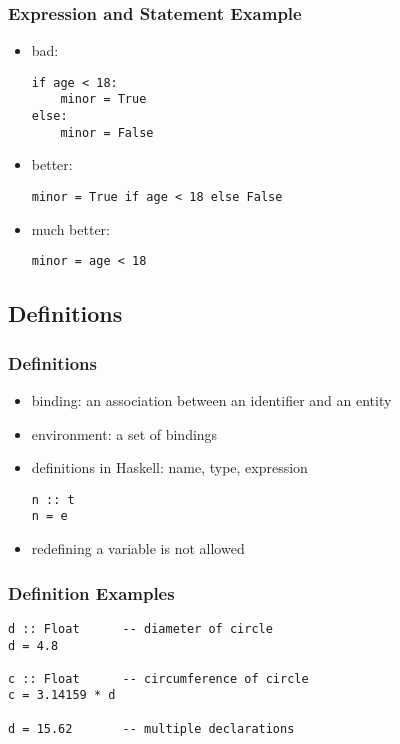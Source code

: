 \documentclass[dvipsnames]{beamer}
\theoremstyle{plain}
\begin{document}
\begin{frame}[fragile]
  \frametitle{Expression and Statement Example}

  \begin{itemize}
    \item bad:
    \smallskip
    \begin{lstlisting}
if age < 18:
    minor = True
else:
    minor = False
    \end{lstlisting}

    \pause
    \medskip
    \item better:
    \smallskip
    \begin{lstlisting}
minor = True if age < 18 else False
    \end{lstlisting}

    \pause
    \medskip
    \item much better:
    \smallskip
    \begin{lstlisting}
minor = age < 18
    \end{lstlisting}
  \end{itemize}
\end{frame}

\subsection{Definitions}


\begin{frame}[fragile]
  \frametitle{Definitions}

  \begin{itemize}
    \item \alert{binding}: an association between an identifier and an entity
    \item \alert{environment}: a set of bindings

    \pause
    \bigskip
    \item definitions in Haskell: name, type, expression
    \begin{lstlisting}
n :: t
n = e
    \end{lstlisting}

    \item redefining a variable is not allowed
  \end{itemize}
\end{frame}

\begin{frame}[fragile]
  \frametitle{Definition Examples}

  \begin{lstlisting}
d :: Float      -- diameter of circle
d = 4.8

c :: Float      -- circumference of circle
c = 3.14159 * d

d = 15.62       -- multiple declarations
  \end{lstlisting}
\end{frame}
\end{document}
